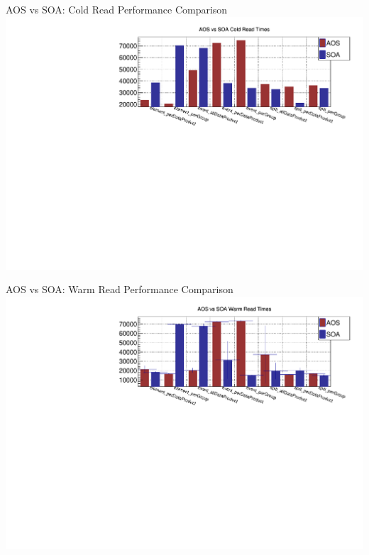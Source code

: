 \documentclass[aspectratio=169]{beamer}
\begin{document}
\begin{frame}{AOS vs SOA: Cold Read Performance Comparison}
\centering
\includegraphics[width=0.9\linewidth]{../experiments/comparison_cold_times.pdf}
\end{frame}

\begin{frame}{AOS vs SOA: Warm Read Performance Comparison}
\centering
\includegraphics[width=0.9\linewidth]{../experiments/comparison_warm_times.pdf}
\end{frame}
\end{document}

